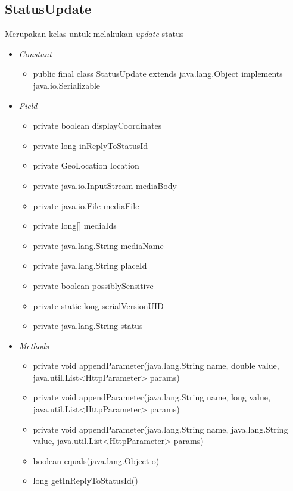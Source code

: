 	\subsection{StatusUpdate}
	Merupakan kelas untuk melakukan \textit{update} status
	\begin{itemize}
		\item \textit{Constant}
		
		\begin{itemize}
			\item public final class StatusUpdate
			extends java.lang.Object
			implements java.io.Serializable
		\end{itemize}
		
		\item \textit{Field}
		
		\begin{itemize}
			\item private boolean displayCoordinates
			\item private long inReplyToStatusId 
			\item private GeoLocation location 
			\item private java.io.InputStream mediaBody 
			\item private java.io.File mediaFile 
			\item private long[] mediaIds 
			\item private java.lang.String mediaName 
			\item private java.lang.String placeId 
			\item private boolean possiblySensitive 
			\item private static long serialVersionUID 
			\item private java.lang.String status 
		\end{itemize}
		\item \textit{Methods}
		
		\begin{itemize}
			\item private void appendParameter(java.lang.String name, double value, java.util.List<HttpParameter> params) 
			\item private void appendParameter(java.lang.String name, long value, java.util.List<HttpParameter> params) 
			\item private void appendParameter(java.lang.String name, java.lang.String value, java.util.List<HttpParameter> params) 
			\item boolean equals(java.lang.Object o) 
			\item long getInReplyToStatusId() 
			

\end{itemize}
\end{itemize}
